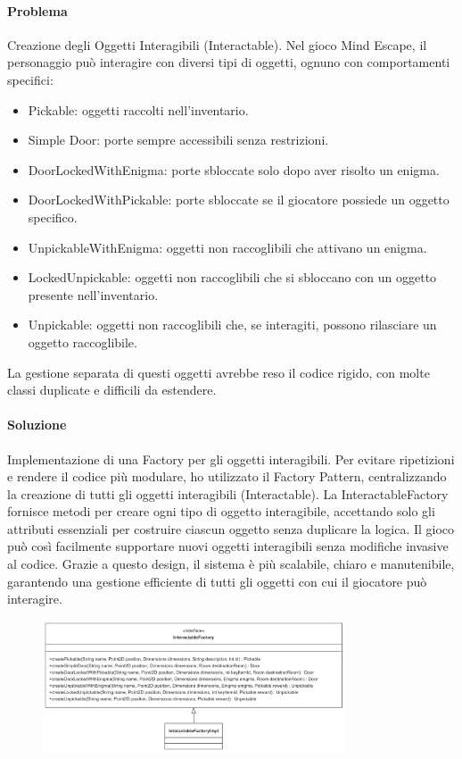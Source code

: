 \documentclass[a4paper,12pt]{report}
\begin{document}
\paragraph{Problema} %
Creazione degli Oggetti Interagibili (Interactable).
Nel gioco Mind Escape, il personaggio può interagire con diversi tipi di oggetti, ognuno con comportamenti specifici:
\begin{itemize}
	\item Pickable: oggetti raccolti nell'inventario.
	\item Simple Door: porte sempre accessibili senza restrizioni.
	\item DoorLockedWithEnigma: porte sbloccate solo dopo aver risolto un enigma.
	\item DoorLockedWithPickable: porte sbloccate se il giocatore possiede un oggetto specifico.
	\item UnpickableWithEnigma: oggetti non raccoglibili che attivano un enigma.
	\item LockedUnpickable: oggetti non raccoglibili che si sbloccano con un oggetto presente nell'inventario.
	\item Unpickable: oggetti non raccoglibili che, se interagiti, possono rilasciare un oggetto raccoglibile.
\end{itemize}
La gestione separata di questi oggetti avrebbe reso il codice rigido, con molte classi duplicate e difficili da estendere.
\paragraph{Soluzione} %
Implementazione di una Factory per gli oggetti interagibili.
Per evitare ripetizioni e rendere il codice più modulare, ho utilizzato il Factory Pattern, centralizzando la creazione di tutti gli oggetti interagibili (Interactable). La InteractableFactory fornisce metodi per creare ogni tipo di oggetto interagibile, accettando solo gli attributi essenziali per costruire ciascun oggetto senza duplicare la logica.
Il gioco può così facilmente supportare nuovi oggetti interagibili senza modifiche invasive al codice.
Grazie a questo design, il sistema è più scalabile, chiaro e manutenibile, garantendo una gestione efficiente di tutti gli oggetti con cui il giocatore può interagire.
\begin{figure}[h]
    \centering
    \includegraphics[width=0.8\textwidth]{img/InteractableFactory.png}
    \label{img:InteractableFactory}
\end{figure}
\end{document}
